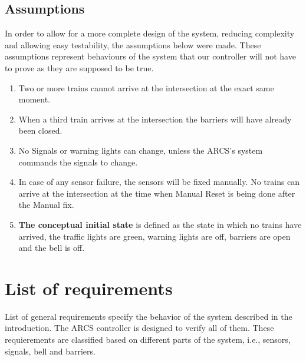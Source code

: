 \documentclass[10pt,a4paper]{article}
\begin{document}
\subsection{Assumptions}
In order to allow for a more complete design of the system, reducing complexity and allowing easy testability, the assumptions below were made. These assumptions represent behaviours of the system that our controller will not have to prove as they are supposed to be true.
\begin{enumerate}
\item Two or more trains cannot arrive at the intersection at the exact same moment.
\item When a third train arrives at the intersection the barriers will have already been closed.
\item No Signals or warning lights can change, unless the ARCS's system commands the signals to change.
\item In case of any sensor failure, the sensors will be fixed manually. No trains can arrive at the intersection at the time when Manual Reset is being done after the Manual fix.
\item \textbf{The conceptual initial state} is defined as the state in which no trains have arrived, the traffic lights are green, warning lights are off, barriers are open and the bell is off.
\end{enumerate}

    

\newpage

\section{List of requirements}
List of general requirements specify the behavior of the system described in the introduction. The ARCS controller is designed to verify all of them. These requierements are classified based on different parts of the system, i.e., sensors, signals, bell and barriers.
\end{document}
